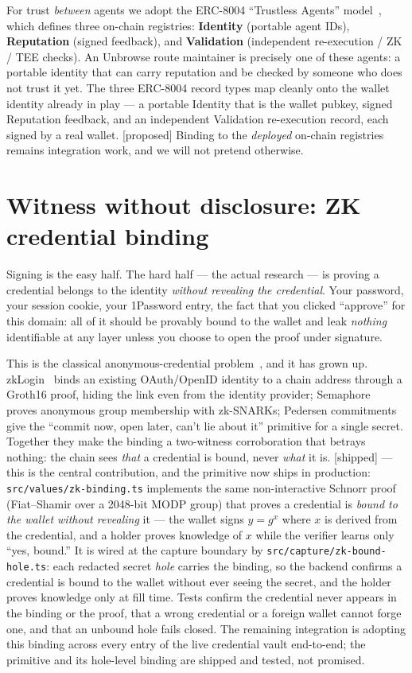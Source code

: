 \documentclass[11pt]{article}
\newcommand{\impl}{\textcolor{green!55!black}{\small[shipped]}}
\newcommand{\prop}{\textcolor{orange!80!black}{\small[proposed]}}
\begin{document}
For trust \emph{between} agents we adopt the ERC-8004 ``Trustless Agents''
model~\cite{erc8004}, which defines three on-chain registries: \textbf{Identity}
(portable agent IDs), \textbf{Reputation} (signed feedback), and
\textbf{Validation} (independent re-execution / ZK / TEE checks). An Unbrowse route
maintainer is precisely one of these agents: a portable identity that can carry
reputation and be checked by someone who does not trust it yet. The three ERC-8004
record types map cleanly onto the wallet identity already in play --- a portable
Identity that is the wallet pubkey, signed Reputation feedback, and an independent
Validation re-execution record, each signed by a real wallet. \prop{} %
Binding to the \emph{deployed} on-chain registries remains integration work, and we
will not pretend otherwise.

\section{Witness without disclosure: ZK credential binding}

Signing is the easy half. The hard half --- the actual research --- is proving a
credential belongs to the identity \emph{without revealing the credential}. Your
password, your session cookie, your 1Password entry, the fact that you clicked
``approve'' for this domain: all of it should be provably bound to the wallet and
leak \emph{nothing} identifiable at any layer unless you choose to open the proof
under signature.

This is the classical anonymous-credential problem~\cite{camlys}, and it has grown
up. zkLogin~\cite{zklogin} binds an existing OAuth/OpenID identity to a chain
address through a Groth16 proof, hiding the link even from the identity provider;
Semaphore~\cite{semaphore} proves anonymous group membership with zk-SNARKs;
Pedersen commitments~\cite{pedersen} give the ``commit now, open later, can't lie
about it'' primitive for a single secret. Together they make the binding a
two-witness corroboration that betrays nothing: the chain sees \emph{that} a
credential is bound, never \emph{what} it is. \impl{} --- this is the central
contribution, and the primitive now ships in production: \texttt{src/values/zk-binding.ts}
implements the same non-interactive Schnorr proof (Fiat--Shamir over a 2048-bit MODP
group) that proves a credential is \emph{bound to the wallet without revealing} it ---
the wallet signs $y=g^{x}$ where $x$ is derived from the credential, and a holder
proves knowledge of $x$ while the verifier learns only ``yes, bound.'' It is wired at
the capture boundary by \texttt{src/capture/zk-bound-hole.ts}: each redacted secret
\emph{hole} carries the binding, so the backend confirms a credential is bound to the
wallet without ever seeing the secret, and the holder proves knowledge only at fill
time. Tests confirm the credential never appears in the binding or the proof, that a
wrong credential or a foreign wallet cannot forge one, and that an unbound hole fails
closed. The remaining integration is adopting this binding across every entry of the
live credential vault end-to-end; the primitive and its hole-level binding are shipped
and tested, not promised.
\end{document}
